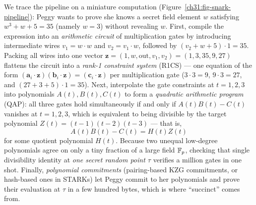 We trace the pipeline on a miniature computation (Figure~\ref{ch31:fig-snark-pipeline}): Peggy wants to prove she knows a secret field element $w$ satisfying $w^3 + w + 5 = 35$ (namely $w = 3$) without revealing $w$. First, compile the expression into an \emph{arithmetic circuit} of multiplication gates by introducing intermediate wires $v_1 = w \cdot w$ and $v_2 = v_1 \cdot w$, followed by $(v_2 + w + 5)\cdot 1 = 35$. Packing all wires into one vector $\mathbf{z} = (1, w, \text{out}, v_1, v_2) = (1, 3, 35, 9, 27)$ flattens the circuit into a \emph{rank-1 constraint system} (R1CS) --- one equation of the form $(\mathbf{a}_i\cdot\mathbf{z})(\mathbf{b}_i\cdot\mathbf{z}) = (\mathbf{c}_i\cdot\mathbf{z})$ per multiplication gate ($3\cdot 3 = 9$, $9\cdot 3 = 27$, and $(27 + 3 + 5)\cdot 1 = 35$). Next, interpolate the gate constraints at $t = 1, 2, 3$ into polynomials $A(t), B(t), C(t)$ to form a \emph{quadratic arithmetic program} (QAP): all three gates hold simultaneously if and only if $A(t)B(t) - C(t)$ vanishes at $t = 1, 2, 3$, which is equivalent to being divisible by the target polynomial $Z(t) = (t-1)(t-2)(t-3)$ --- that is, \[
  A(t)B(t) - C(t) = H(t)Z(t)
\]
for some quotient polynomial $H(t)$. Because two unequal low-degree polynomials agree on only a tiny fraction of a large field $\mathbb{F}_p$, checking that single divisibility identity at \emph{one secret random point $\tau$} verifies a million gates in one shot. Finally, \emph{polynomial commitments} (pairing-based KZG commitments, or hash-based ones in STARKs) let Peggy commit to her polynomials and prove their evaluation at $\tau$ in a few hundred bytes, which is where ``succinct'' comes from.

